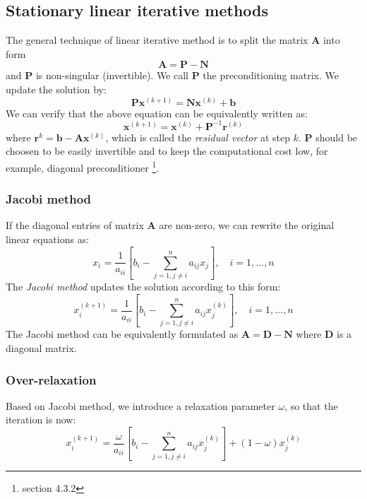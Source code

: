 \documentclass{article}
\begin{document}
\subsection{Stationary linear iterative methods}
The general technique of linear iterative method is to split the matrix $\mathbf{A}$
into form 
\[\mathbf{A} = \mathbf{P} - \mathbf{N}\]
and $\mathbf{P}$ is non-singular (invertible). We call $\mathbf{P}$ the 
preconditioning matrix. We update the solution by:
\[\mathbf{P}\mathbf{x}^{(k+1)} = \mathbf{N}\mathbf{x}^{(k)} + \mathbf{b}\]
We can verify that the above equation can be equivalently written as:
\[\mathbf{x}^{(k+1)} = \mathbf{x}^{(k)} + \mathbf{P}^{-1}\mathbf{r}^{(k)}\]
where $\mathbf{r}^{k} = \mathbf{b} - \mathbf{A}\mathbf{x}^{(k)}$, which is called 
the \emph{residual vector} at step $k$. $\mathbf{P}$ should be choosen to be easily invertible
and to keep the computational cost low, for example, diagonal preconditioner
\footnote{section 4.3.2}. 

\subsubsection{Jacobi method}
If the diagonal entries of matrix $\mathbf{A}$ are non-zero, we can rewrite the 
original linear equations as:
\begin{equation}
    x_i = \frac{1}{a_{ii}}\left[
        b_i - \sum_{j=1, j\neq i}^n a_{ij}x_j
    \right], \quad i = 1, \dots, n
\end{equation}
The \emph{Jacobi method} updates the solution according to this form:
\begin{equation}
    x_i^{(k+1)} = \frac{1}{a_{ii}}\left[
        b_i - \sum_{j=1, j\neq i}^n a_{ij}x_j^{(k)}
    \right], \quad i = 1, \dots, n
\end{equation}
The Jacobi method can be equivalently formulated as 
$\mathbf{A} = \mathbf{D} - \mathbf{N}$ where $\mathbf{D}$ is a diagonal matrix.

\subsubsection{Over-relaxation}
Based on Jacobi method, we introduce a relaxation parameter $\omega$, so that 
the iteration is now:
\begin{equation}
    x_i^{(k+1)} = \frac{\omega}{a_{ii}}\left[
        b_i - \sum_{j=1, j\neq i}^n a_{ij}x_j^{(k)}
    \right] + (1-\omega)x_j^{(k)}
\end{equation}
\end{document}
